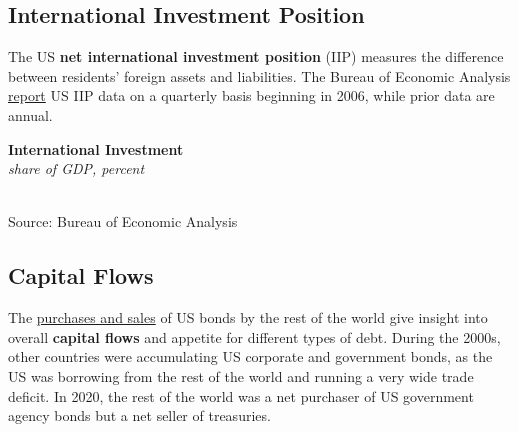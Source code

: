 \documentclass{report}
\makeatletter
\newcommand{\tbllink}[1]{\href{https://raw.githubusercontent.com/bdecon/US-chartbook/master/chartbook/data/#1}{\faTable}}
\newcommand*\short[1]{\expandafter\@gobbletwo\number\numexpr#1\relax}
\newcommand{\dateaxisticks}{
		date coordinates in=x, axis line style={draw=none},
		xmax={2024-01-31},
		max space between ticks=40,	    
		xtick={{1990-01-01}, {1992-01-01}, {1994-01-01}, 
			{1996-01-01}, {1998-01-01}, {2000-01-01}, 
			{2002-01-01}, {2004-01-01}, {2006-01-01},
			{2008-01-01}, {2010-01-01}, {2012-01-01}, {2014-01-01},
		    {2016-01-01}, {2018-01-01}, {2020-01-01}, {2022-01-01}, 
		    {2024-01-01}, {2026-01-01}},
		minor xtick={{1989-01-01}, {1991-01-01}, {1993-01-01},
			{1995-01-01}, {1997-01-01}, {1999-01-01}, 
			{2001-01-01}, {2003-01-01}, {2005-01-01}, {2007-01-01},
		    {2009-01-01}, {2011-01-01}, {2013-01-01}, {2015-01-01},
		    {2017-01-01}, {2019-01-01}, {2021-01-01}, {2023-01-01}, 
		    {2025-01-01}, {2027-01-01}},
		enlarge y limits={0.06}, enlarge x limits={0.01},
		xticklabel style={align=center, yshift=-2pt}, tick label style={inner sep=0pt},
		}
\newcommand{\bbar}[2]{extra #1 ticks = {{#2}}, extra #1 tick labels = ,
		extra #1 tick style = {grid=major, grid style={thick, black!25}},}
\newcommand{\rbars}{
		\fill[color=black!10] (axis cs:{1990-07-01},\pgfkeysvalueof{/pgfplots/ymin})
			rectangle (axis cs:{1991-03-01}, \pgfkeysvalueof{/pgfplots/ymax});
		\fill[color=black!10] (axis cs:{2007-12-01},\pgfkeysvalueof{/pgfplots/ymin})
			rectangle (axis cs:{2009-07-01}, \pgfkeysvalueof{/pgfplots/ymax});
		\fill[color=black!10] (axis cs:{2001-03-01},\pgfkeysvalueof{/pgfplots/ymin})
			rectangle (axis cs:{2001-11-01}, \pgfkeysvalueof{/pgfplots/ymax});
		\fill[color=black!10] (axis cs:{2020-02-01},\pgfkeysvalueof{/pgfplots/ymin})
			rectangle (axis cs:{2020-05-01}, \pgfkeysvalueof{/pgfplots/ymax});}
\makeatother
\begin{document}
{\begin{minipage}{1.0\textwidth}
\subsection*{International Investment Position}
\vspace{-0.5mm}
\small The US \textbf{net international investment position} (IIP) measures the difference between residents' foreign assets and liabilities. The Bureau of Economic Analysis \href{https://www.bea.gov/data/intl-trade-investment/international-investment-position}{report} US IIP data on a quarterly basis beginning in 2006, while prior data are annual. 


\vspace{1mm}

\normalsize \textbf{International Investment}\\
\footnotesize{\textit{share of GDP, percent}}
\vspace*{-12mm}

\hspace*{-1mm} \\
\footnotesize{Source: Bureau of Economic Analysis} \hfill \tbllink{iip.csv}
\end{minipage}
\newpage
\hypertarget{excf}{\label{excf}}
\begin{minipage}{1.0\textwidth}
\subsection*{Capital Flows}
\vspace{-0.5mm}
\small The \href{https://home.treasury.gov/data/treasury-international-capital-tic-system}{purchases and sales} of US bonds by the rest of the world give insight into overall \textbf{capital flows} and appetite for different types of debt. During the 2000s, other countries were accumulating US corporate and government bonds, as the US was borrowing from the rest of the world and running a very wide trade deficit. In 2020, the rest of the world was a net purchaser of US government agency bonds but a net seller of treasuries. 


\end{minipage}}
\end{document}
